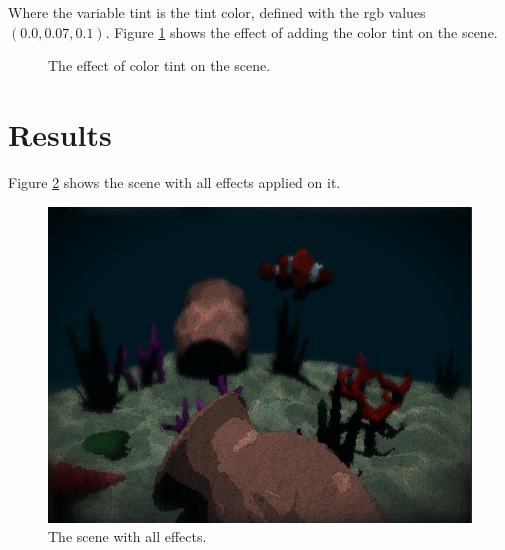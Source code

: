 \documentclass{article}
\begin{document}
\medskip \par
\noindent
Where the variable tint is the tint color, defined with the rgb values $(0.0, 0.07, 0.1)$.
Figure \ref{fig:scene_with_tint} shows the effect of adding the color tint on the scene.

\begin{figure}[h]
	\centering
	\hspace{0.5em}
	\caption{The effect of color tint on the scene.}
	\label{fig:scene_with_tint}
\end{figure}


\section{Results}
Figure \ref{fig:result} shows the scene with all effects applied on it.
\begin{figure}[h]
	\centering
	\includegraphics[width=\linewidth]{imgs/all_scene.jpg}
	\caption{The scene with all effects.}
	\label{fig:result}
\end{figure}
\end{document}
